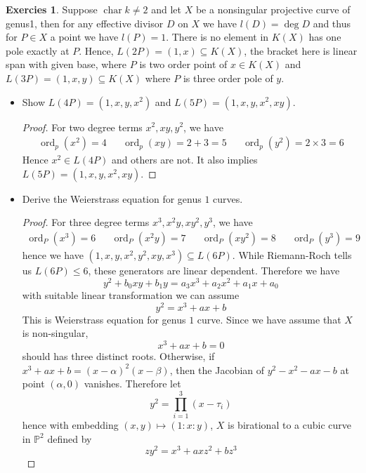 \documentclass[12pt,a4paper]{article}
\theoremstyle{definition}
\newtheorem{exer}{Exercies}[section]
\DeclareMathOperator{\Char}{char}
\DeclareMathOperator{\ord}{ord}
\begin{document}
\begin{exer}
	Suppose $\Char k \neq 2$ and let $X$ be a nonsingular projective curve of genus1, then for any effective divisor $D$ on $X$ we have $l(D) = \deg D$ and thus for $P \in X$ a point we have $l(P)=1$. There is no element in $K(X)$ has one pole exactly at $P$. Hence, $L(2P)=(1,x) \subseteq K(X)$, the bracket here is linear span with given base, where $P$ is two order point of $x \in K(X)$ and $L(3P) = (1,x,y) \subseteq K(X)$ where $P$ is three order pole of $y$.
	\begin{itemize}
		\item Show $L(4P)= (1,x,y,x^2)$ and $L(5P)= (1,x,y,x^2,xy)$.
		\begin{proof}
			For two degree terms $x^2, xy, y^2$, we have\[
			\begin{aligned}
			\ord_p(x^2)= 4& &\ord_p(xy) = 2+ 3 =5 & &\ord_p(y^2)= 2\times 3=6
			\end{aligned}
			\]
			Hence $x^2 \in L(4P)$ and others are not.
			It also implies $L(5P) = (1,x,y,x^2,xy)$.
		\end{proof}
	\item Derive the Weierstrass equation for genus $1$ curves.
	\begin{proof}
		For three degree terms $x^3,x^2y,xy^2,y^3$, we have \[
		\begin{aligned}
		\ord_P(x^3) =6 & & \ord_P(x^2y)= 7 & & \ord_P(xy^2)=8 & &\ord_P(y^3)=9
		\end{aligned}
		\] hence we have $(1,x,y,x^2,y^2,xy, x^3) \subseteq L(6P)$. While Riemann-Roch tells us $L(6P) \leq 6$, these generators are linear dependent. Therefore we have
		\[
		y^2+b_0xy + b_1 y = a_3 x^3 + a_2 x^2 + a_1 x + a_0
		\]
		with suitable linear transformation we can assume
		\[
		y^2= x^3 +a x +b
		\]
		This is Weierstrass equation for genus $1$ curve.
		Since we have assume that $X$ is non-singular, 
		\[
		x^3+ax+b =0
		\]
		should has three distinct roots. Otherwise, if $x^3+ax+b = (x-\alpha)^2(x-\beta)$, then the Jacobian of $y^2-x^2-ax-b$ at point $(\alpha,0)$ vanishes. Therefore let
		\[
		y^2 = \prod_{i=1}^3(x-\tau_i)
		\]
		hence with embedding $(x,y) \mapsto (1:x:y)$, $X$ is birational to a cubic curve in $\mathbb{P}^2$ defined by
		\[
		zy^2= x^3+axz^2+bz^3
		\]
	\end{proof}
	\end{itemize}
\end{exer}
\end{document}
